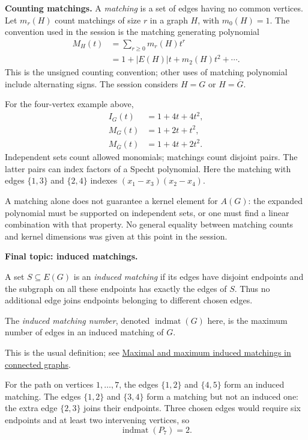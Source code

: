 \medskip\noindent
\textbf{Counting matchings.}
A \emph{matching} is a set of edges
having no common vertices.
Let $m_r(H)$ count matchings of size $r$
in a graph $H$, with $m_0(H)=1$.
The convention used in the session is
the matching generating polynomial
$$
\begin{aligned}
M_H(t)&=\sum_{r\geq0}m_r(H)t^r\\
&=1+|E(H)|t+m_2(H)t^2+\cdots.
\end{aligned}
$$
This is the unsigned counting convention;
other uses of matching polynomial
include alternating signs.
The session considers $H=G$ or
$H=\overline G$.

For the four-vertex example above,
$$
\begin{aligned}
I_G(t)&=1+4t+4t^2,\\
M_G(t)&=1+2t+t^2,\\
M_{\overline G}(t)&=1+4t+2t^2.
\end{aligned}
$$
Independent sets count allowed monomials;
matchings count disjoint pairs.
The latter pairs can index factors
of a Specht polynomial.
Here the matching with edges
$\{1,3\}$ and $\{2,4\}$ indexes
$(x_1-x_3)(x_2-x_4)$.

A matching alone does not guarantee a
kernel element for $A(G)$:
the expanded polynomial must be supported
on independent sets, or one must find
a linear combination with that property.
No general equality between matching
counts and kernel dimensions was
given at this point in the session.

\medskip\noindent
\textbf{Final topic: induced matchings.}

\begin{definition}
\label{definition-session-induced-matching}
A set $S\subseteq E(G)$ is an
\emph{induced matching} if its edges
have disjoint endpoints and the subgraph
on all these endpoints has exactly
the edges of $S$.
Thus no additional edge joins endpoints
belonging to different chosen edges.

The \emph{induced matching number},
denoted $\operatorname{indmat}(G)$ here,
is the maximum number of edges in an
induced matching of $G$.
\end{definition}

This is the usual definition; see
\href{%
https://arxiv.org/abs/2410.11288%
}{Maximal and maximum induced matchings
in connected graphs}.

For the path on vertices $1,\ldots,7$,
the edges $\{1,2\}$ and $\{4,5\}$
form an induced matching.
The edges $\{1,2\}$ and $\{3,4\}$
form a matching but not an induced one:
the extra edge $\{2,3\}$ joins their
endpoints.
Three chosen edges would require six
endpoints and at least two intervening
vertices, so
$$
\operatorname{indmat}(P_7)=2.
$$

